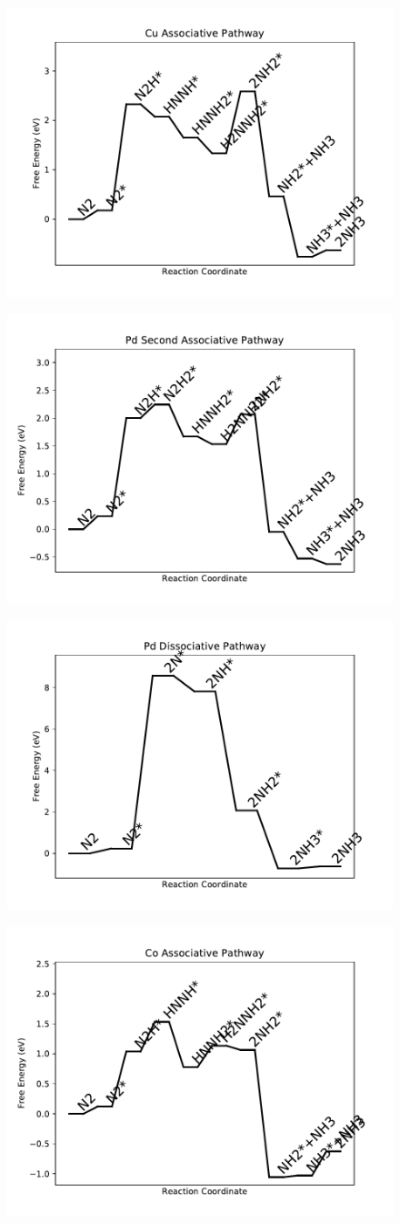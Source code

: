 \documentclass[journal=jacsat,manuscript=article]{achemso}
\begin{document}
\begin{figure}
\includegraphics[width=0.5\linewidth]{data/plots/Cu_associative.pdf}
\label{fig:Cu_associative}
\end{figure}

\newpage
\begin{figure}
\includegraphics[width=0.5\linewidth]{data/plots/Pd_associative_2.pdf}
\label{fig:Pd_associative_2}
\end{figure}

\begin{figure}
\includegraphics[width=0.5\linewidth]{data/plots/Pd_dissociative.pdf}
\label{fig:Pd_dissociative}
\end{figure}

\newpage
\begin{figure}
\includegraphics[width=0.5\linewidth]{data/plots/Co_associative.pdf}
\label{fig:Co_associative}
\end{figure}
\end{document}
